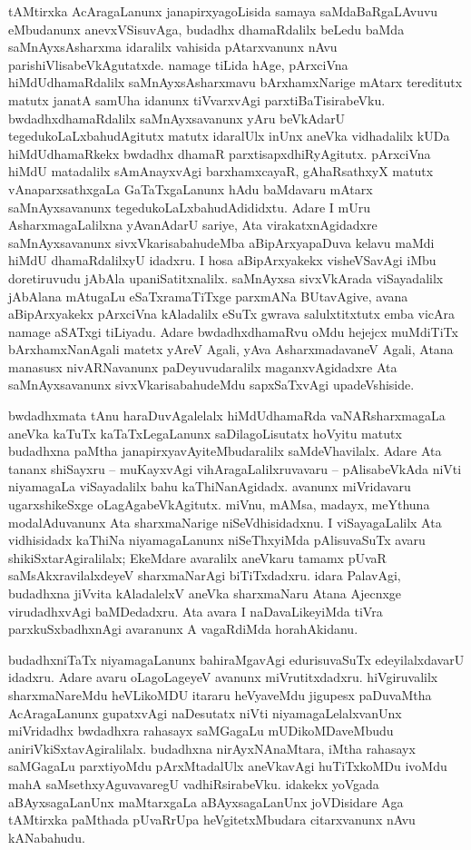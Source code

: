 tAMtirxka AcAragaLanunx janapirxyagoLisida samaya saMdaBaRgaLAvuvu eMbu\-danunx anevxVSisuvAga, budadhx dhamaRdalilx beLedu baMda saMnAyxsAsharxma idaralilx vahisida pAtarxvanunx nAvu parishiVlisabeVkAgutatxde. namage tiLida hAge, pArxciVna hiMdUdhamaRdalilx saMnAyxsAsharxmavu bArxhamxNarige mAtarx tereditutx matutx janatA samUha idanunx tiVvarxvAgi parxtiBaTisirabeVku. bwdadhxdhamaRdalilx saMnAyxsavanunx yAru beVkAdarU tegedukoLaLxbahudAgitutx matutx idaralUlx inUnx aneVka vidhadalilx kUDa hiMdUdhamaRkekx bwdadhx dhamaR parxtisapxdhiRyAgitutx. pArxciVna hiMdU matadalilx sAmAnayxvAgi barxhamxcayaR, gAhaRsathxyX matutx vAnaparxsathxgaLa GaTaTxgaLanunx hAdu baMdavaru mAtarx saMnAyxsavanunx tegedukoLaLxbahudAdididxtu. Adare I mUru AsharxmagaLalilxna yAvanAdarU sariye, Ata virakatxnAgidadxre saMnAyxsavanunx sivxVkarisabahudeMba aBipArxyapaDuva kelavu maMdi hiMdU dhamaRdalilxyU idadxru. I hosa aBipArxyakekx visheVSavAgi iMbu doretiruvudu jAbAla upaniSatitxnalilx. saMnAyxsa sivxVkArada viSayadalilx jAbAlana mAtugaLu eSaTxramaTiTxge parxmANa BUtavAgive, avana aBipArxyakekx pArxciVna kAladalilx eSuTx gwrava salulxtitxtutx emba vicAra namage aSATxgi tiLiyadu. Adare bwdadhxdhamaRvu oMdu hejejcx muMdiTiTx bArxhamxNanAgali matetx yAreV Agali, yAva AsharxmadavaneV Agali, Atana manasusx nivARNavanunx paDeyuvudaralilx maganxvAgidadxre Ata saMnAyxsavanunx sivxVkarisabahudeMdu sapxSaTxvAgi upadeVshiside.

bwdadhxmata tAnu haraDuvAgalelalx hiMdUdhamaRda vaNARsharxmagaLa aneVka kaTuTx kaTaTxLegaLanunx saDilagoLisutatx hoVyitu matutx budadhxna paMtha janapirxyavAyi\-teMbuda\-ralilx saMdeVhavilalx. Adare Ata tananx shiSayxru -- muKayxvAgi vihAragaLalilxruvavaru -- pAlisabeVkAda niVti niyamagaLa viSayadalilx bahu kaThiNanAgidadx. avanunx miVridavaru ugarxshikeSxge oLagAgabeVkAgitutx. miVnu, mAMsa, madayx, meYthuna modalAduvanunx Ata sharxmaNarige niSeVdhisidadxnu. I viSayagaLalilx Ata vidhisidadx kaThiNa niyamagaLanunx niSeThxyiMda pAlisuvaSuTx avaru shikiSxtarAgiralilalx; EkeMdare avaralilx aneVkaru tamamx pUvaR saMsAkxravilalxdeyeV sharxmaNarAgi biTiTxdadxru. idara PalavAgi, budadhxna jiVvita kAladalelxV aneVka sharxmaNaru Atana Ajecnxge virudadhxvAgi baMDedadxru. Ata avara I naDavaLikeyiMda tiVra parxkuSxbadhxnAgi avaranunx A vagaRdiMda horahAkidanu.

budadhxniTaTx niyamagaLanunx bahiraMgavAgi edurisuvaSuTx edeyilalxdavarU idadxru. Adare avaru oLagoLageyeV avanunx miVrutitxdadxru. hiVgiruvalilx sharxmaNareMdu heVLikoMDU itararu heVyaveMdu jigupesx paDuvaMtha AcAragaLanunx gupatxvAgi naDesutatx niVti niyamagaLelalxvanUnx miVridadhx bwdadhxra rahasayx saMGagaLu mUDikoMDaveMbudu aniriVkiSxtavAgiralilalx. budadhxna nirAyxNAnaMtara, iMtha rahasayx saMGagaLu parxtiyoMdu pArxMtadalUlx aneVkavAgi huTiTxkoMDu ivoMdu mahA saMsethxyAguvavaregU vadhiRsirabeVku. idakekx yoVgada aBAyxsagaLanUnx maMtarxgaLa aBAyxsagaLanUnx joVDisidare Aga tAMtirxka paMthada pUvaRrUpa heVgitetxMbudara citarxvanunx nAvu kANabahudu.

